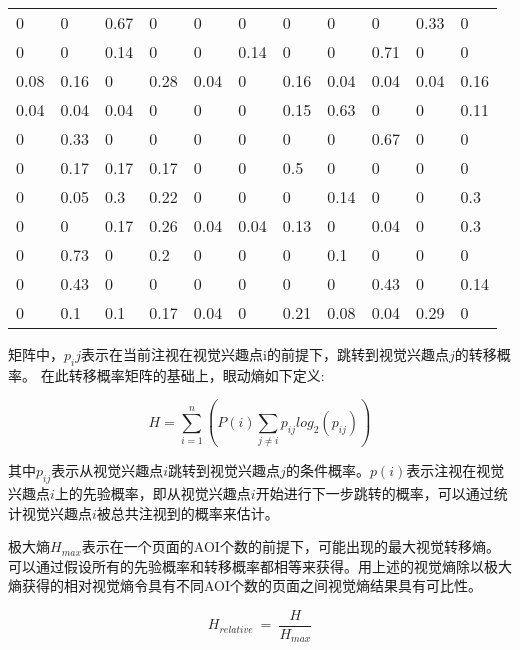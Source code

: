 \begin{table}[H]
\centering
  \begin{tabular}{@{}lllllllllll@{}}
  \hline
  0    & 0    & 0.67 & 0    & 0    & 0    & 0    & 0    & 0    & 0.33 & 0    \\
  0    & 0    & 0.14 & 0    & 0    & 0.14 & 0    & 0    & 0.71 & 0    & 0    \\
  0.08 & 0.16 & 0    & 0.28 & 0.04 & 0    & 0.16 & 0.04 & 0.04 & 0.04 & 0.16 \\
  0.04 & 0.04 & 0.04 & 0    & 0    & 0    & 0.15 & 0.63 & 0    & 0    & 0.11 \\
  0    & 0.33 & 0    & 0    & 0    & 0    & 0    & 0    & 0.67 & 0    & 0    \\
  0    & 0.17 & 0.17 & 0.17 & 0    & 0    & 0.5  & 0    & 0    & 0    & 0    \\
  0    & 0.05 & 0.3  & 0.22 & 0    & 0    & 0    & 0.14 & 0    & 0    & 0.3  \\
  0    & 0    & 0.17 & 0.26 & 0.04 & 0.04 & 0.13 & 0    & 0.04 & 0    & 0.3  \\
  0    & 0.73 & 0    & 0.2  & 0    & 0    & 0    & 0.1  & 0    & 0    & 0    \\
  0    & 0.43 & 0    & 0    & 0    & 0    & 0    & 0    & 0.43 & 0    & 0.14 \\
  0    & 0.1  & 0.1  & 0.17 & 0.04 & 0    & 0.21 & 0.08 & 0.04 & 0.29 & 0\\
  \hline
  \end{tabular}
\end{table}

矩阵中，$p_ij$表示在当前注视在视觉兴趣点i的前提下，跳转到视觉兴趣点$j$的转移概率。
在此转移概率矩阵的基础上，眼动熵如下定义:

$$H = \sum_{i=1}^n(P(i)\sum_{j\neq i} p_{ij}log_2(p_{ij}))$$

其中$p_{ij}$表示从视觉兴趣点$i$跳转到视觉兴趣点$j$的条件概率。$p(i)$表示注视在视觉兴趣点$i$上的先验概率，即从视觉兴趣点$i$开始进行下一步跳转的概率，可以通过统计视觉兴趣点$i$被总共注视到的概率来估计。

极大熵$H_{max}$表示在一个页面的AOI个数的前提下，可能出现的最大视觉转移熵。可以通过假设所有的先验概率和转移概率都相等来获得。用上述的视觉熵除以极大熵获得的相对视觉熵令具有不同AOI个数的页面之间视觉熵结果具有可比性。

$$H_{relative}~=~\frac{H}{H_{max}}$$

